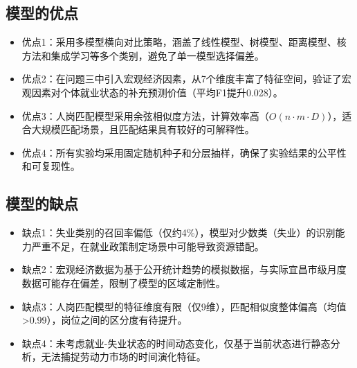 \documentclass[withoutpreface,bwprint]{cumcmthesis}
\begin{document}
\subsection{模型的优点}
\begin{itemize}[itemindent=2em]
\item 优点1：采用多模型横向对比策略，涵盖了线性模型、树模型、距离模型、核方法和集成学习等多个类别，避免了单一模型选择偏差。
\item 优点2：在问题三中引入宏观经济因素，从7个维度丰富了特征空间，验证了宏观因素对个体就业状态的补充预测价值（平均F1提升0.028）。
\item 优点3：人岗匹配模型采用余弦相似度方法，计算效率高（$O(n \cdot m \cdot D)$），适合大规模匹配场景，且匹配结果具有较好的可解释性。
\item 优点4：所有实验均采用固定随机种子和分层抽样，确保了实验结果的公平性和可复现性。
\end{itemize}

\subsection{模型的缺点}
\begin{itemize}[itemindent=2em]
\item 缺点1：失业类别的召回率偏低（仅约4\%），模型对少数类（失业）的识别能力严重不足，在就业政策制定场景中可能导致资源错配。
\item 缺点2：宏观经济数据为基于公开统计趋势的模拟数据，与实际宜昌市级月度数据可能存在偏差，限制了模型的区域定制性。
\item 缺点3：人岗匹配模型的特征维度有限（仅9维），匹配相似度整体偏高（均值>0.99），岗位之间的区分度有待提升。
\item 缺点4：未考虑就业-失业状态的时间动态变化，仅基于当前状态进行静态分析，无法捕捉劳动力市场的时间演化特征。
\end{itemize}

\newpage

\nocite{*}


\end{document}
